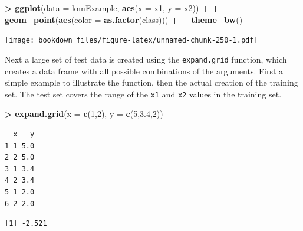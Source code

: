 \documentclass[]{krantz}
\makeatletter
\newenvironment{Shaded}{\begin{snugshade}}{\end{snugshade}}
\newcommand{\KeywordTok}[1]{\textcolor[rgb]{0.27,0.27,0.27}{\textbf{#1}}}
\newcommand{\DataTypeTok}[1]{\textcolor[rgb]{0.27,0.27,0.27}{#1}}
\newcommand{\DecValTok}[1]{\textcolor[rgb]{0.06,0.06,0.06}{#1}}
\newcommand{\FloatTok}[1]{\textcolor[rgb]{0.06,0.06,0.06}{#1}}
\newcommand{\StringTok}[1]{\textcolor[rgb]{0.5,0.5,0.5}{#1}}
\newcommand{\OperatorTok}[1]{\textcolor[rgb]{0.43,0.43,0.43}{\textbf{#1}}}
\newcommand{\NormalTok}[1]{#1}
\newenvironment{kframe}{%
\medskip{}
\setlength{\fboxsep}{.8em}
 \def\at@end@of@kframe{}%
 \ifinner\ifhmode%
  \def\at@end@of@kframe{\end{minipage}}%
  \begin{minipage}{\columnwidth}%
 \fi\fi%
 \def\FrameCommand##1{\hskip\@totalleftmargin \hskip-\fboxsep
 \colorbox{shadecolor}{##1}\hskip-\fboxsep
     \hskip-\linewidth \hskip-\@totalleftmargin \hskip\columnwidth}%
 \MakeFramed {\advance\hsize-\width
   \@totalleftmargin\z@ \linewidth\hsize
   \@setminipage}}%
 {\par\unskip\endMakeFramed%
 \at@end@of@kframe}
\renewenvironment{Shaded}{\begin{kframe}}{\end{kframe}}
\makeatother
\begin{document}
\begin{Shaded}
\begin{Highlighting}[]
\OperatorTok{>}\StringTok{ }\KeywordTok{ggplot}\NormalTok{(}\DataTypeTok{data =}\NormalTok{ knnExample, }\KeywordTok{aes}\NormalTok{(}\DataTypeTok{x =}\NormalTok{ x1, }\DataTypeTok{y =}\NormalTok{ x2)) }\OperatorTok{+}\StringTok{ }
\OperatorTok{+}\StringTok{    }\KeywordTok{geom_point}\NormalTok{(}\KeywordTok{aes}\NormalTok{(}\DataTypeTok{color =} \KeywordTok{as.factor}\NormalTok{(class))) }\OperatorTok{+}
\OperatorTok{+}\StringTok{    }\KeywordTok{theme_bw}\NormalTok{()}
\end{Highlighting}
\end{Shaded}

\texttt{[image: bookdown\_files/figure-latex/unnamed-chunk-250-1.pdf]}

Next a large set of test data is created using the \texttt{expand.grid}
function, which creates a data frame with all possible combinations of
the arguments. First a simple example to illustrate the function, then
the actual creation of the training set. The test set covers the range
of the \texttt{x1} and \texttt{x2} values in the training set.

\begin{Shaded}
\begin{Highlighting}[]
\OperatorTok{>}\StringTok{ }\KeywordTok{expand.grid}\NormalTok{(}\DataTypeTok{x =} \KeywordTok{c}\NormalTok{(}\DecValTok{1}\NormalTok{,}\DecValTok{2}\NormalTok{), }\DataTypeTok{y =} \KeywordTok{c}\NormalTok{(}\DecValTok{5}\NormalTok{,}\FloatTok{3.4}\NormalTok{,}\DecValTok{2}\NormalTok{))}
\end{Highlighting}
\end{Shaded}

\begin{verbatim}
  x   y
1 1 5.0
2 2 5.0
3 1 3.4
4 2 3.4
5 1 2.0
6 2 2.0
\end{verbatim}

\begin{Shaded}
\end{Shaded}

\begin{verbatim}
[1] -2.521
\end{verbatim}

\begin{Shaded}
\end{Shaded}
\end{document}
